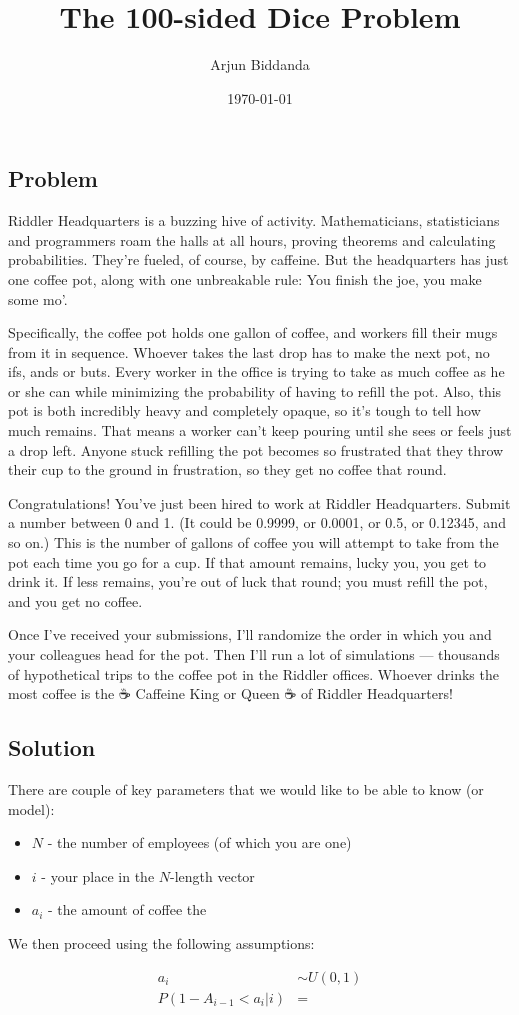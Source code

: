 \documentclass[12pt]{article}
\title{The 100-sided Dice Problem}
\author{Arjun Biddanda}
\date{\today}
\begin{document}
\maketitle
\linenumbers

\subsection*{Problem}

Riddler Headquarters is a buzzing hive of activity. Mathematicians, statisticians and programmers roam the halls at all hours, proving theorems and calculating probabilities. They’re fueled, of course, by caffeine. But the headquarters has just one coffee pot, along with one unbreakable rule: You finish the joe, you make some mo’.

Specifically, the coffee pot holds one gallon of coffee, and workers fill their mugs from it in sequence. Whoever takes the last drop has to make the next pot, no ifs, ands or buts. Every worker in the office is trying to take as much coffee as he or she can while minimizing the probability of having to refill the pot. Also, this pot is both incredibly heavy and completely opaque, so it’s tough to tell how much remains. That means a worker can’t keep pouring until she sees or feels just a drop left. Anyone stuck refilling the pot becomes so frustrated that they throw their cup to the ground in frustration, so they get no coffee that round.

Congratulations! You’ve just been hired to work at Riddler Headquarters. Submit a number between 0 and 1. (It could be 0.9999, or 0.0001, or 0.5, or 0.12345, and so on.) This is the number of gallons of coffee you will attempt to take from the pot each time you go for a cup. If that amount remains, lucky you, you get to drink it. If less remains, you’re out of luck that round; you must refill the pot, and you get no coffee.

Once I’ve received your submissions, I’ll randomize the order in which you and your colleagues head for the pot. Then I’ll run a lot of simulations — thousands of hypothetical trips to the coffee pot in the Riddler offices. Whoever drinks the most coffee is the ☕ Caffeine King or Queen ☕ of Riddler Headquarters!

\subsection*{Solution}

There are couple of key parameters that we would like to be able to know (or model):

\begin{itemize}
  \item $N$ - the number of employees (of which you are one)
  \item $i$ - your place in the $N$-length vector
  \item $a_i$ - the amount of coffee the
\end{itemize}

We then proceed using the following assumptions:

$$
\begin{aligned}
a_i &\sim U(0,1)\\
P(1 - A_{i-1}  < a_i| i) &=
\end{aligned}
$$
\end{document}
